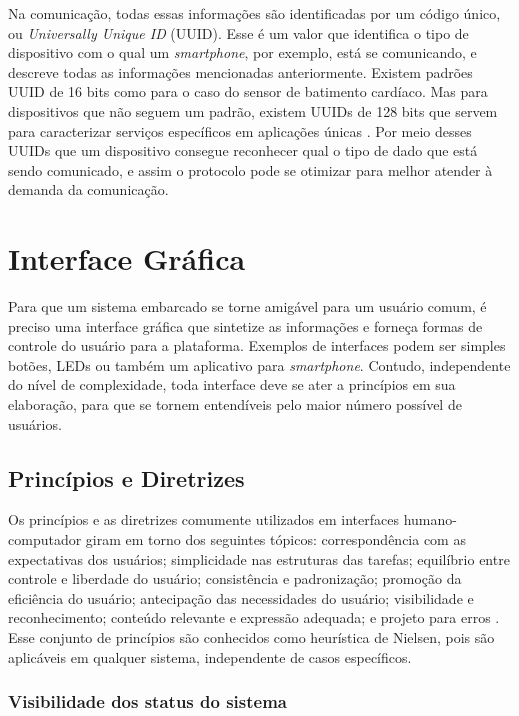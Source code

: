 Na comunicação, todas essas informações são identificadas por um código único, ou \textit{Universally Unique ID} (UUID). Esse é um valor que identifica o tipo de dispositivo com o qual um \textit{smartphone}, por exemplo, está se comunicando, e descreve todas as informações mencionadas anteriormente. Existem padrões UUID de 16 bits como para o caso do sensor de batimento cardíaco. Mas para dispositivos que não seguem um padrão, existem UUIDs de 128 bits que servem para caracterizar serviços específicos em aplicações únicas \cite{site:devzonebtle}. Por meio desses UUIDs que um dispositivo consegue reconhecer qual o tipo de dado que está sendo comunicado, e assim o protocolo pode se otimizar para melhor atender à demanda da comunicação.

\section{Interface Gráfica}
Para que um sistema embarcado se torne amigável para um usuário comum, é preciso uma interface gráfica que sintetize as informações e forneça formas de controle do usuário para a plataforma. Exemplos de interfaces podem ser simples botões, LEDs ou também um aplicativo para \textit{smartphone}. Contudo, independente do nível de complexidade, toda interface deve se ater a princípios em sua elaboração, para que se tornem entendíveis pelo maior número possível de usuários.

\subsection{Princípios e Diretrizes}

Os princípios e as diretrizes comumente utilizados em interfaces humano-computador giram em torno dos seguintes tópicos: correspondência com as expectativas dos usuários; simplicidade nas estruturas das tarefas; equilíbrio entre controle e liberdade do usuário; consistência e padronização; promoção da eficiência do usuário; antecipação das necessidades do usuário; visibilidade e reconhecimento; conteúdo relevante e expressão adequada; e projeto para erros \cite{BarbosaEtAl2021InteracaoHumanoComputadorExperiencia}.
Esse conjunto de princípios são conhecidos como heurística de Nielsen, pois são aplicáveis em qualquer sistema, independente de casos específicos.

\subsubsection{Visibilidade dos status do sistema}

